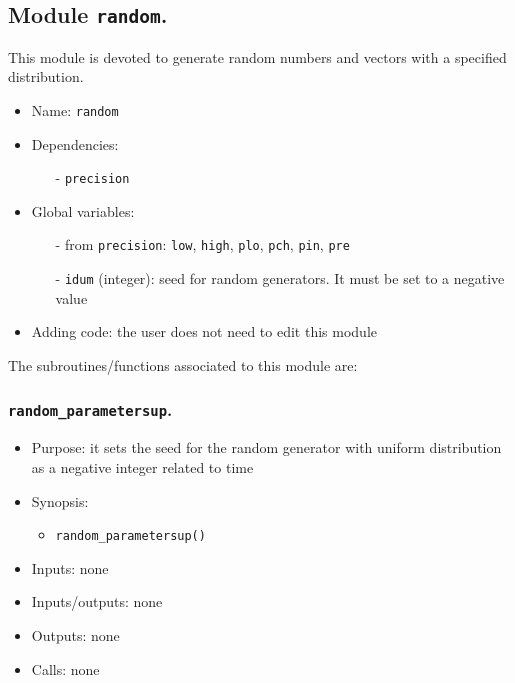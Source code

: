 \documentclass[12pt]{article}
\begin{document}
\subsection{Module {\tt random}.}
This module is devoted to generate random numbers and vectors with a specified distribution. 
\begin{itemize}
\item Name: {\tt random}
\item Dependencies: 
\begin{itemize}
\item[-] {\tt precision}
\end{itemize}
\item Global variables: 
\begin{itemize}
\item[-] from {\tt precision}: {\tt low}, {\tt high}, {\tt plo}, {\tt pch}, {\tt pin}, {\tt pre} 
\item[-] {\tt idum} (integer): seed for random generators. It must be set to a negative value
\end{itemize}
\item Adding code: the user does not need to edit this module
\end{itemize}

The subroutines/functions associated to this module are:

\subsubsection{{\tt random\_parametersup}.}
\begin{itemize}
\item Purpose: it sets the seed for the random generator with uniform distribution as a negative integer related to time
\item Synopsis: 
\begin{itemize}
\item {\tt random\_parametersup()}
\end{itemize}
\item Inputs: none
\item Inputs/outputs: none
\item Outputs: none
\item Calls: none
\end{itemize} 
\end{document}
